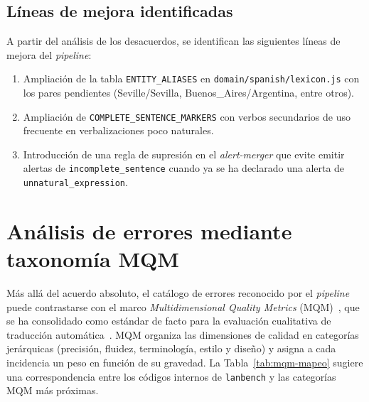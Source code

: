 \subsection{Líneas de mejora identificadas}

A partir del análisis de los desacuerdos, se identifican las siguientes líneas
de mejora del \textit{pipeline}:

\begin{enumerate}
	\item Ampliación de la tabla \texttt{ENTITY\_ALIASES} en
	      \texttt{domain/spanish/lexicon.js} con los pares pendientes (Seville/Sevilla,
	      Buenos\_Aires/Argentina, entre otros).
	\item Ampliación de \texttt{COMPLETE\_SENTENCE\_MARKERS} con verbos secundarios de
	      uso frecuente en verbalizaciones poco naturales.
	\item Introducción de una regla de supresión en el \textit{alert-merger} que evite
	      emitir alertas de \texttt{incomplete\_sentence} cuando ya se ha declarado una
	      alerta de \texttt{unnatural\_expression}.
\end{enumerate}

\section{Análisis de errores mediante taxonomía MQM}
\label{sec:analisis-mqm}

Más allá del acuerdo absoluto, el catálogo de errores reconocido por el
\textit{pipeline} puede contrastarse con el marco \textit{Multidimensional
	Quality Metrics} (MQM)~\cite{Lommel2014}, que se ha consolidado como estándar
de facto para la evaluación cualitativa de traducción
automática~\cite{Freitag2021}. MQM organiza las dimensiones de calidad en
categorías jerárquicas (precisión, fluidez, terminología, estilo y diseño) y
asigna a cada incidencia un peso en función de su gravedad. La
Tabla~\ref{tab:mqm-mapeo} sugiere una correspondencia entre los códigos
internos de \texttt{lanbench} y las categorías MQM más próximas.

